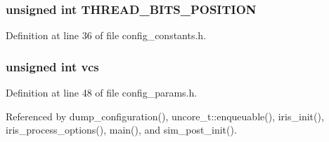 \subsubsection[{THREAD\_\-BITS\_\-POSITION}]{\setlength{\rightskip}{0pt plus 5cm}unsigned int {\bf THREAD\_\-BITS\_\-POSITION}}\label{sim_8h_581f0c063e972c5f202149f2e3ce7452}




Definition at line 36 of file config\_\-constants.h.
\subsubsection[{vcs}]{\setlength{\rightskip}{0pt plus 5cm}unsigned int {\bf vcs}}\label{sim_8h_7ef93ae807d4d29652202027711634cf}




Definition at line 48 of file config\_\-params.h.

Referenced by dump\_\-configuration(), uncore\_\-t::enqueuable(), iris\_\-init(), iris\_\-process\_\-options(), main(), and sim\_\-post\_\-init().